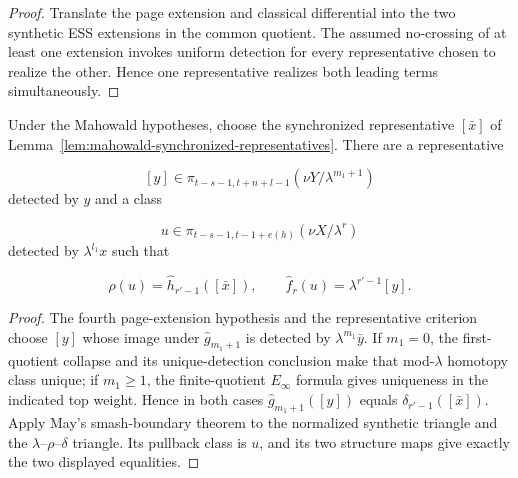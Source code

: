 \begin{proof}
  Translate the page extension and classical differential into the two
  synthetic ESS extensions in the common quotient.  The assumed no-crossing
  of at least one extension invokes uniform detection for every representative
  chosen to realize the other.  Hence one representative realizes both
  leading terms simultaneously.
\end{proof}

\begin{lemma}
  \label{lem:mahowald-compatible-quotient-lift}
  \notready
  Under the Mahowald hypotheses, choose the synchronized representative
  $[\bar x]$ of Lemma~\ref{lem:mahowald-synchronized-representatives}.
  There are a representative

  \[
    [y]\in\pi_{t-s-1,t+n+l-1}(\nu Y/\lambda^{m_1+1})
  \]
  detected by $y$ and a class

  \[
    u\in\pi_{t-s-1,t-1+e(h)}(\nu X/\lambda^r)
  \]
  detected by $\lambda^{l_1}x$ such that

  \[
    \rho(u)=\widehat h_{r'-1}([\bar x]),
    \qquad
    \widehat f_r(u)=\lambda^{r'-1}[y].
  \]
\end{lemma}

\begin{proof}
  The fourth page-extension hypothesis and the representative criterion choose
  $[y]$ whose image under $\widehat g_{m_1+1}$ is detected by
  $\lambda^{m_1}\bar y$.  If $m_1=0$, the first-quotient collapse and its
  unique-detection conclusion make that mod-$\lambda$ homotopy class unique;
  if $m_1\ge1$, the finite-quotient $E_\infty$ formula gives uniqueness in the
  indicated top weight.  Hence in both cases
  $\widehat g_{m_1+1}([y])$ equals
  $\delta_{r'-1}([\bar x])$.  Apply May's smash-boundary theorem to the
  normalized synthetic triangle and the $\lambda$--$\rho$--$\delta$ triangle.
  Its pullback class is $u$, and its two structure maps give exactly the two
  displayed equalities.
\end{proof}

